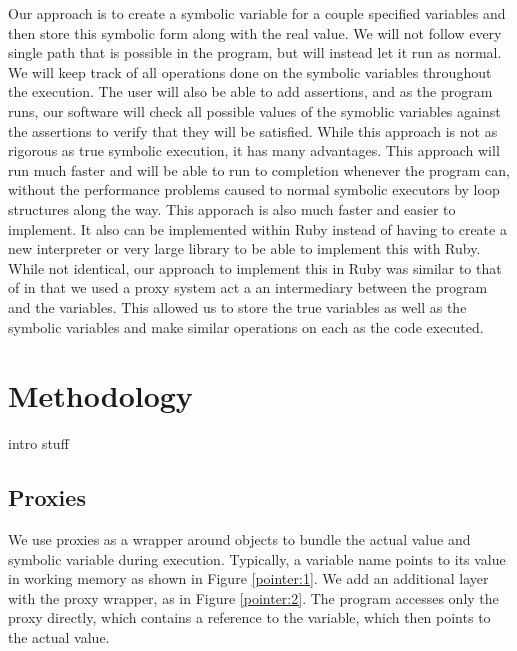 \documentclass[10pt]{article}
\begin{document}
Our approach is to create a symbolic variable for a couple specified variables and then store this symbolic form along with the real value.  We will not follow every single path that is possible in the program, but will instead let it run as normal.  We will keep track of all operations done on the symbolic variables throughout the execution.  The user will also be able to add assertions, and as the program runs, our software will check all possible values of the symoblic variables against the assertions to verify that they will be satisfied.  While this approach is not as rigorous as true symbolic execution, it has many advantages.  This approach will run much faster and will be able to run to completion whenever the program can, without the performance problems caused to normal symbolic executors by loop structures along the way.  This apporach is also much faster and easier to implement.  It also can be implemented within Ruby instead of having to create a new interpreter or very large library to be able to implement this with Ruby.\\

While not identical, our approach to implement this in Ruby was similar to that of \cite{typeinf} in that we used a proxy system act a an intermediary between the program and the variables.  This allowed us to store the true variables as well as the symbolic variables and make similar operations on each as the code executed.\\

\section{Methodology}
intro stuff

\subsection{Proxies}
We use proxies as a wrapper around objects to bundle the actual value and symbolic variable during execution.  Typically, a variable name points to its value in working memory as shown in Figure \ref{pointer:1}.  We add an additional layer with the proxy wrapper, as in Figure \ref{pointer:2}.  The program accesses only the proxy directly, which contains a reference to the variable, which then points to the actual value.
\end{document}
